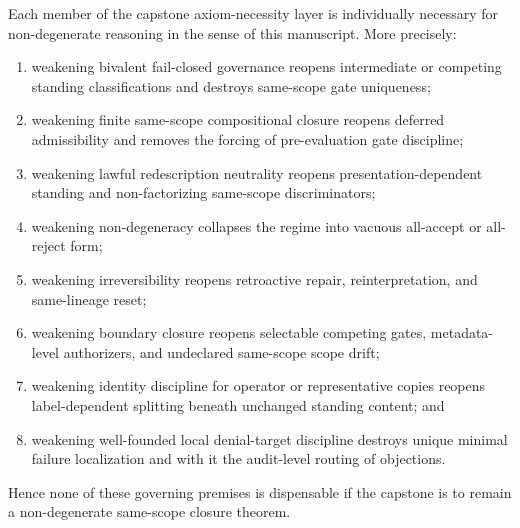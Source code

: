 \begin{theorem}
\label{thm:axiom-necessity-layer}
Each member of the capstone axiom-necessity layer is individually necessary for non-degenerate reasoning in the sense of this manuscript. More precisely:
\begin{enumerate}
  \item weakening bivalent fail-closed governance reopens intermediate or competing standing classifications and destroys same-scope gate uniqueness;
  \item weakening finite same-scope compositional closure reopens deferred admissibility and removes the forcing of pre-evaluation gate discipline;
  \item weakening lawful redescription neutrality reopens presentation-dependent standing and non-factorizing same-scope discriminators;
  \item weakening non-degeneracy collapses the regime into vacuous all-accept or all-reject form;
  \item weakening irreversibility reopens retroactive repair, reinterpretation, and same-lineage reset;
  \item weakening boundary closure reopens selectable competing gates, metadata-level authorizers, and undeclared same-scope scope drift;
  \item weakening identity discipline for operator or representative copies reopens label-dependent splitting beneath unchanged standing content; and
  \item weakening well-founded local denial-target discipline destroys unique minimal failure localization and with it the audit-level routing of objections.
\end{enumerate}
Hence none of these governing premises is dispensable if the capstone is to remain a non-degenerate same-scope closure theorem.
\end{theorem}

